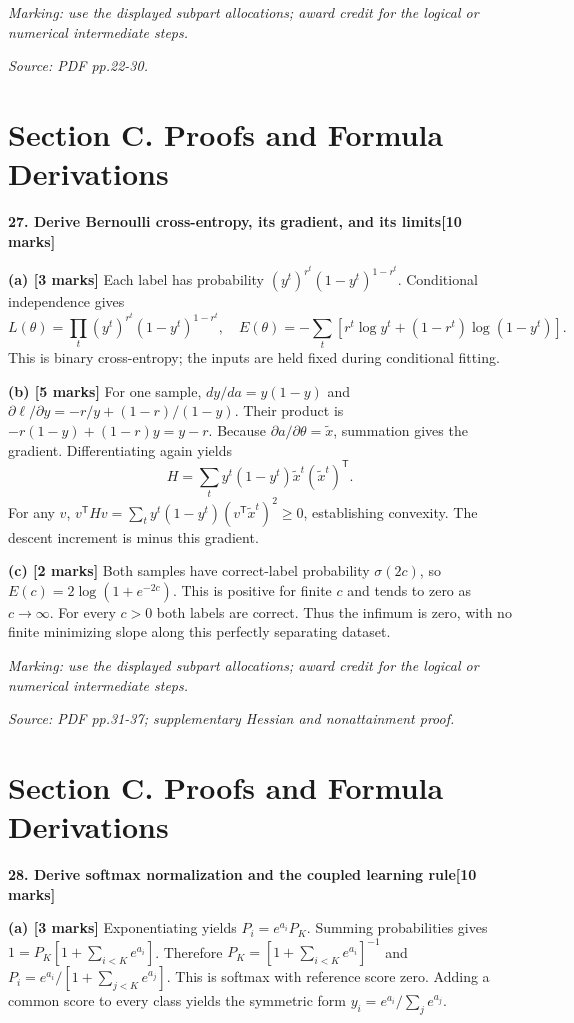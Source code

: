\documentclass[11pt,a4paper]{article}
\begin{document}
\textit{Marking: use the displayed subpart allocations; award credit for the logical or numerical intermediate steps.}\par
{\footnotesize\textit{Source: PDF pp.22-30.}}
\newpage\section*{Section C. Proofs and Formula Derivations}
\textbf{27. Derive Bernoulli cross-entropy, its gradient, and its limits}\hfill\textbf{[10 marks]}\par\medskip
\textbf{(a) [3 marks]} Each label has probability \((y^t)^{r^t}(1-y^t)^{1-r^t}\). Conditional independence gives \[L(\theta)=\prod_t(y^t)^{r^t}(1-y^t)^{1-r^t},\quad E(\theta)=-\sum_t[r^t\log y^t+(1-r^t)\log(1-y^t)].\] This is binary cross-entropy; the inputs are held fixed during conditional fitting.

\textbf{(b) [5 marks]} For one sample, \(dy/da=y(1-y)\) and \(\partial\ell/\partial y=-r/y+(1-r)/(1-y)\). Their product is \(-r(1-y)+(1-r)y=y-r\). Because \(\partial a/\partial\theta=\widetilde x\), summation gives the gradient. Differentiating again yields \[H=\sum_t y^t(1-y^t)\widetilde x^t(\widetilde x^t)^{\mathsf T}.\] For any \(v\), \(v^{\mathsf T}Hv=\sum_t y^t(1-y^t)(v^{\mathsf T}\widetilde x^t)^2\ge0\), establishing convexity. The descent increment is minus this gradient.

\textbf{(c) [2 marks]} Both samples have correct-label probability \(\sigma(2c)\), so \(E(c)=2\log(1+e^{-2c})\). This is positive for finite \(c\) and tends to zero as \(c\to\infty\). For every \(c>0\) both labels are correct. Thus the infimum is zero, with no finite minimizing slope along this perfectly separating dataset.

\textit{Marking: use the displayed subpart allocations; award credit for the logical or numerical intermediate steps.}\par
{\footnotesize\textit{Source: PDF pp.31-37; supplementary Hessian and nonattainment proof.}}
\newpage\section*{Section C. Proofs and Formula Derivations}
\textbf{28. Derive softmax normalization and the coupled learning rule}\hfill\textbf{[10 marks]}\par\medskip
\textbf{(a) [3 marks]} Exponentiating yields \(P_i=e^{a_i}P_K\). Summing probabilities gives \(1=P_K[1+\sum_{i<K}e^{a_i}]\). Therefore \(P_K=[1+\sum_{i<K}e^{a_i}]^{-1}\) and \(P_i=e^{a_i}/[1+\sum_{j<K}e^{a_j}]\). This is softmax with reference score zero. Adding a common score to every class yields the symmetric form \(y_i=e^{a_i}/\sum_j e^{a_j}\).
\end{document}
